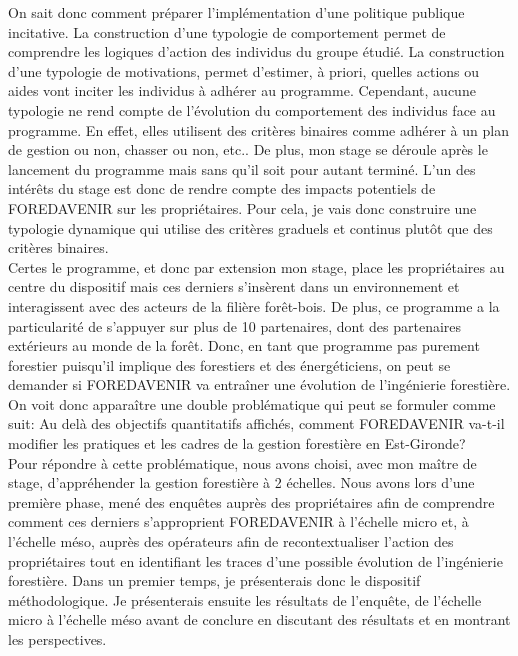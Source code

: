 \documentclass[12pt]{report}
\begin{document}
On sait donc comment préparer l'implémentation d'une politique publique incitative.
La construction d'une typologie de comportement permet de comprendre les
logiques d'action des individus du groupe étudié. La construction d'une
typologie de motivations, permet d'estimer, à priori, quelles actions ou aides
vont inciter les individus à adhérer au programme. Cependant, aucune typologie
ne rend compte de l'évolution du comportement des individus face au programme.
En effet, elles utilisent des critères binaires comme adhérer à un plan de
gestion ou non, chasser ou non, etc.. De plus, mon stage se déroule après
le lancement du programme mais sans qu'il soit pour autant terminé. L'un des
intérêts du stage est donc de rendre compte
des impacts potentiels de FOREDAVENIR sur les propriétaires. Pour cela, je vais
donc construire une typologie dynamique qui utilise des critères graduels et
continus plutôt que des critères binaires.\\

Certes le programme, et donc par extension mon stage, place les propriétaires au
centre du dispositif mais ces derniers s'insèrent dans un environnement et
interagissent avec des acteurs de la filière forêt-bois. De plus, ce programme
a la particularité de s'appuyer sur plus de 10 partenaires, dont des partenaires
extérieurs au monde de la forêt. Donc, en tant que programme pas purement
forestier puisqu'il implique des forestiers et des énergéticiens, on peut se
demander si FOREDAVENIR va entraîner une évolution de l'ingénierie forestière.
On voit donc apparaître une double problématique qui peut se formuler comme
suit: Au delà des objectifs quantitatifs affichés, comment FOREDAVENIR va-t-il
modifier les pratiques et les cadres de la gestion forestière en Est-Gironde?\\

Pour répondre à cette problématique, nous avons choisi, avec mon maître de stage,
d'appréhender la gestion forestière à 2 échelles. Nous avons lors d'une première
phase, mené des enquêtes auprès des propriétaires afin de comprendre comment ces
derniers s'approprient FOREDAVENIR à l'échelle micro et, à l'échelle méso, auprès
des opérateurs afin de recontextualiser l'action des propriétaires tout en
identifiant les traces d'une possible évolution de l'ingénierie forestière.
Dans un premier temps, je présenterais donc le dispositif méthodologique. Je
présenterais ensuite les résultats de l'enquête, de l'échelle micro à l'échelle
méso avant de conclure en discutant des résultats et en montrant les perspectives.
\end{document}
